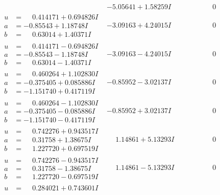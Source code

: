 \documentclass[1p]{elsarticle_modified}
\theoremstyle{definition}
\begin{document}
$$\begin{array}{c|c|c}
 & -5.05641 + 1.58259 I & \phantom{-0.000000 } 0 \\ \hline\begin{aligned}
u &= \phantom{-}0.414171 + 0.694826 I \\
a &= -0.85543 + 1.18748 I \\
b &= \phantom{-}0.63014 + 1.40371 I\end{aligned}
 & -3.09163 + 4.24015 I & \phantom{-0.000000 } 0 \\ \hline\begin{aligned}
u &= \phantom{-}0.414171 - 0.694826 I \\
a &= -0.85543 - 1.18748 I \\
b &= \phantom{-}0.63014 - 1.40371 I\end{aligned}
 & -3.09163 - 4.24015 I & \phantom{-0.000000 } 0 \\ \hline\begin{aligned}
u &= \phantom{-}0.460264 + 1.102830 I \\
a &= -0.375405 + 0.085886 I \\
b &= -1.151740 + 0.417119 I\end{aligned}
 & -0.85952 - 3.02137 I & \phantom{-0.000000 } 0 \\ \hline\begin{aligned}
u &= \phantom{-}0.460264 - 1.102830 I \\
a &= -0.375405 - 0.085886 I \\
b &= -1.151740 - 0.417119 I\end{aligned}
 & -0.85952 + 3.02137 I & \phantom{-0.000000 } 0 \\ \hline\begin{aligned}
u &= \phantom{-}0.742276 + 0.943517 I \\
a &= \phantom{-}0.31758 + 1.38675 I \\
b &= \phantom{-}1.227720 + 0.697519 I\end{aligned}
 & \phantom{-}1.14861 + 5.13293 I & \phantom{-0.000000 } 0 \\ \hline\begin{aligned}
u &= \phantom{-}0.742276 - 0.943517 I \\
a &= \phantom{-}0.31758 - 1.38675 I \\
b &= \phantom{-}1.227720 - 0.697519 I\end{aligned}
 & \phantom{-}1.14861 - 5.13293 I & \phantom{-0.000000 } 0 \\ \hline\begin{aligned}
u &= \phantom{-}0.284021 + 0.743601 I \\

\end{aligned}
\end{array}$$
\end{document}
